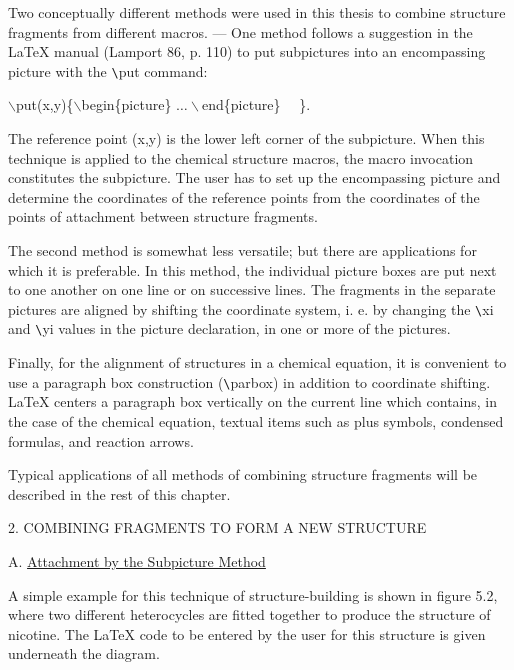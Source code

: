  Two conceptually different methods were used in this thesis 
 to combine structure fragments from different macros. ---     
 One method follows a suggestion in the LaTeX manual (Lamport 86,
 p. 110) to put subpictures into an encompassing picture with
 the \verb+\+put command: \\
 \centerline{$\backslash $put(x,y)\{$\backslash $begin\{picture\}
            $\ldots \backslash $end\{picture\} \ \ \}.  }
 The reference point (x,y) is the lower left corner of the 
 subpicture. When this technique is applied to the chemical
 structure macros, the macro invocation constitutes the
 subpicture. The user has to set up the encompassing picture
 and determine the coordinates of the reference points from     
 the coordinates of the points of attachment between structure
 fragments.

 The second method is somewhat less versatile; but there are
 applications for which it is preferable. In this method, the
 individual picture boxes are put next to one another on one
 line or on successive lines. The fragments in the separate
 pictures are aligned by shifting the coordinate system, i. e.
 by changing the \verb+\+xi and \verb+\+yi values in the
 picture declaration, in one or more of the pictures. 
 
 Finally, for the alignment of structures in a chemical
 equation, it is convenient to use a paragraph box
 construction (\verb+\+parbox) in addition to coordinate
 shifting. LaTeX centers a paragraph box vertically on the
 current line which contains, in the case of the chemical
 equation, textual items such as plus symbols, condensed
 formulas, and reaction arrows.

 Typical applications of all methods of combining structure 
 fragments will be described in the rest of this chapter.
 
 \pagebreak 
 \vspace{\len mm}
 \centerline{2. COMBINING FRAGMENTS TO FORM A NEW STRUCTURE}
 \vspace{\len mm}
 \noindent A. \underline{Attachment by the Subpicture Method}

 A simple example for this technique of structure-building is 
 shown in figure 5.2, where two different heterocycles are
 fitted together to produce the structure of nicotine.
 The LaTeX code to be entered by the user for this structure
 is given underneath the diagram.

